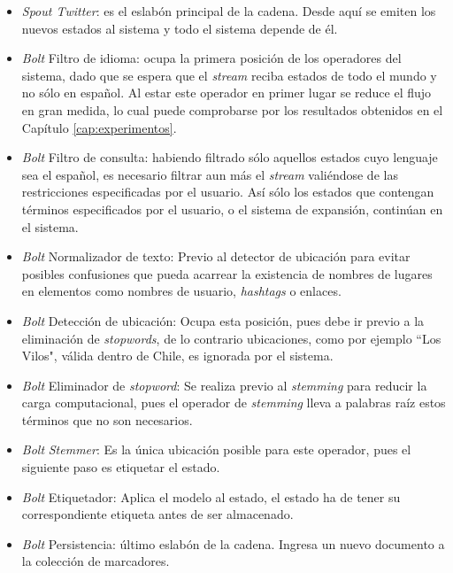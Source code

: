 \begin{itemize}
\item \textit{Spout Twitter}: es el eslabón principal de la cadena. Desde aquí se emiten los nuevos estados al sistema y todo el sistema depende de él. 
\item \textit{Bolt} Filtro de idioma: ocupa la primera posición de los operadores del sistema, dado que se espera que el \textit{stream} reciba estados de todo el mundo y no sólo en español. Al estar este operador en primer lugar se reduce el flujo en gran medida, lo cual puede comprobarse por los resultados obtenidos en el Capítulo \ref{cap:experimentos}.
\item \textit{Bolt} Filtro de consulta: habiendo filtrado sólo aquellos estados cuyo lenguaje sea el español, es necesario filtrar aun más el \textit{stream} valiéndose de las restricciones especificadas por el usuario. Así sólo los estados que contengan términos especificados por el usuario, o el sistema de expansión, continúan en el sistema.
\item\textit{Bolt} Normalizador de texto: Previo al detector de ubicación para evitar posibles confusiones que pueda acarrear la existencia de nombres de lugares en elementos como nombres de usuario, \textit{hashtags} o enlaces.
\item\textit{Bolt} Detección de ubicación: Ocupa esta posición, pues debe ir previo a la eliminación de \textit{stopwords}, de lo contrario ubicaciones, como por ejemplo ``Los Vilos", válida dentro de Chile, es ignorada por el sistema.
\item\textit{Bolt} Eliminador de \textit{stopword}: Se realiza previo al \textit{stemming} para reducir la carga computacional, pues el operador de \textit{stemming} lleva a palabras raíz estos términos que no son necesarios.
\item\textit{Bolt} \textit{Stemmer}: Es la única ubicación posible para este operador, pues el siguiente paso es etiquetar el estado.
\item\textit{Bolt} Etiquetador: Aplica el modelo al estado, el estado ha de tener su correspondiente etiqueta antes de ser almacenado.
\item\textit{Bolt} Persistencia: último eslabón de la cadena. Ingresa un nuevo documento a la colección de marcadores.
\end{itemize}

